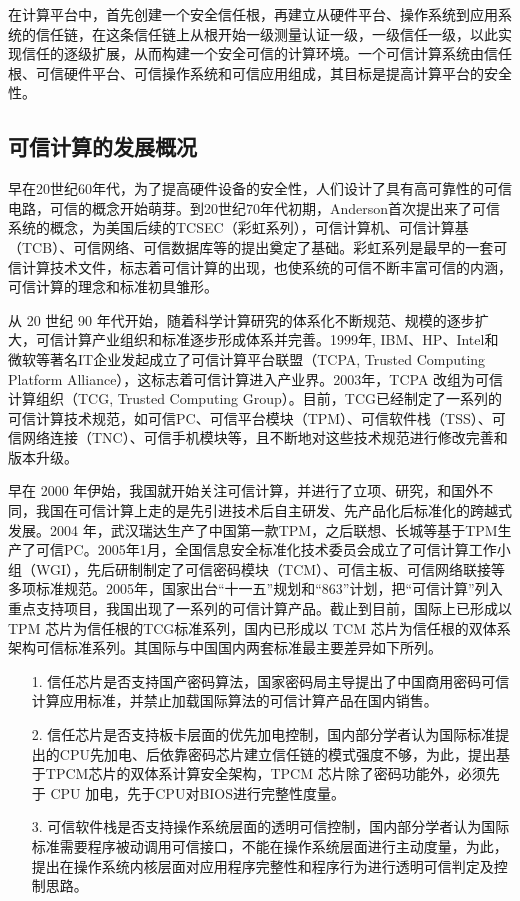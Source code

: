 在计算平台中，首先创建一个安全信任根，再建立从硬件平台、操作系统到应用系统的信任链，在这条信任链上从根开始一级测量认证一级，一级信任一级，以此实现信任的逐级扩展，从而构建一个安全可信的计算环境。一个可信计算系统由信任根、可信硬件平台、可信操作系统和可信应用组成，其目标是提高计算平台的安全性。

\subsection{可信计算的发展概况}

早在20世纪60年代，为了提高硬件设备的安全性，人们设计了具有高可靠性的可信电路，可信的概念开始萌芽。到20世纪70年代初期，Anderson首次提出来了可信系统的概念，为美国后续的TCSEC（彩虹系列），可信计算机、可信计算基（TCB）、可信网络、可信数据库等的提出奠定了基础。彩虹系列是最早的一套可信计算技术文件，标志着可信计算的出现，也使系统的可信不断丰富可信的内涵，可信计算的理念和标准初具雏形。

从 20 世纪 90 年代开始，随着科学计算研究的体系化不断规范、规模的逐步扩大，可信计算产业组织和标准逐步形成体系并完善。1999年, IBM、HP、Intel和微软等著名IT企业发起成立了可信计算平台联盟（TCPA, Trusted Computing Platform Alliance），这标志着可信计算进入产业界。2003年，TCPA 改组为可信计算组织（TCG, Trusted Computing Group）。目前，TCG已经制定了一系列的可信计算技术规范，如可信PC、可信平台模块（TPM）、可信软件栈（TSS）、可信网络连接（TNC）、可信手机模块等，且不断地对这些技术规范进行修改完善和版本升级。

早在 2000 年伊始，我国就开始关注可信计算，并进行了立项、研究，和国外不同，我国在可信计算上走的是先引进技术后自主研发、先产品化后标准化的跨越式发展。2004 年，武汉瑞达生产了中国第一款TPM，之后联想、长城等基于TPM生产了可信PC。2005年1月，全国信息安全标准化技术委员会成立了可信计算工作小组（WGI），先后研制制定了可信密码模块（TCM）、可信主板、可信网络联接等多项标准规范。2005年，国家出台“十一五”规划和“863”计划，把“可信计算”列入重点支持项目，我国出现了一系列的可信计算产品。截止到目前，国际上已形成以 TPM 芯片为信任根的TCG标准系列，国内已形成以 TCM 芯片为信任根的双体系架构可信标准系列。其国际与中国国内两套标准最主要差异如下所列。

\begin{itemize}
\item [1.] 信任芯片是否支持国产密码算法，国家密码局主导提出了中国商用密码可信计算应用标准，并禁止加载国际算法的可信计算产品在国内销售。
\item [2.]信任芯片是否支持板卡层面的优先加电控制，国内部分学者认为国际标准提出的CPU先加电、后依靠密码芯片建立信任链的模式强度不够，为此，提出基于TPCM芯片的双体系计算安全架构，TPCM 芯片除了密码功能外，必须先于 CPU 加电，先于CPU对BIOS进行完整性度量。
\item [3.] 可信软件栈是否支持操作系统层面的透明可信控制，国内部分学者认为国际标准需要程序被动调用可信接口，不能在操作系统层面进行主动度量，为此，提出在操作系统内核层面对应用程序完整性和程序行为进行透明可信判定及控制思路。
\end{itemize}

